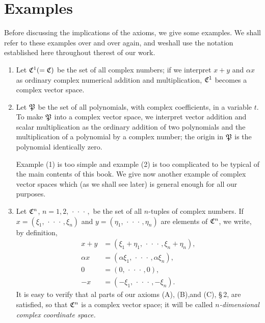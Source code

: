 \section{Examples}\label{sec-examples}

Before discussing the implications of the axioms, we give some examples. We
shall refer to these examples over and over again, and weshall use the notation
established here throughout therest of our work.

\begin{enumerate}[label=(\arabic*), wide, nosep]
    \item Let \(\mathfrak{C}^1 (= \mathfrak{C})\) be the set of all complex numbers; if we
    interpret \(x + y\) and \(\alpha x\) as ordinary complex numerical addition and
    multiplication, \(\mathfrak{C}^1\) becomes a complex vector space.
    
    \item Let \(\mathfrak{P}\) be the set of all polynomials, with complex
    coefficients, in a variable \(t\). To make \(\mathfrak{P}\) into a complex
    vector space, we interpret vector addition and scalar multiplication as the
    ordinary addition of two polynomials and the multiplication of a polynomial
    by a complex number; the origin in \(\mathfrak{P}\) is the polynomial
    identically zero.
    
    Example (1) is too simple and example (2) is too complicated to be typical
    of the main contents of this book. We give now another example of complex
    vector spaces which (as we shall see later) is general enough for all our
    purposes. 
    
    \item Let \(\mathfrak{C}^n\), \(n = 1, 2, \,\cdot\,\cdot\,\cdot\,,\) be the set
    of all \(n\)-tuples of complex numbers. If \(x =
    (\xi_1,\,\cdot\,\cdot\,\cdot\,, \xi_n)\) and \(y = (\eta_1,
    \,\cdot\,\cdot\,\cdot\,, \eta_n)\) are elements of \(\mathfrak{C}^n\), we write,
    by definition,
    \begin{align*}
        x + y &= (\xi_1 + \eta_1, \,\cdot\,\cdot\,\cdot\,, \xi_n + \eta_n),\\
        \alpha x &= (\alpha \xi_1, \,\cdot\,\cdot\,\cdot\,, \alpha \xi_n),\\
        0 &= (0, \,\cdot\,\cdot\,\cdot\,, 0),\\
        -x &= (-\xi_1, \,\cdot\,\cdot\,\cdot\,, -\xi_n).
    \end{align*}
    It is easy to verify that al parts of our axioms (A), (B),and (C), \S\,2,
    are satisfied, so that \(\mathfrak{C}^n\) is a complex vector space; it will be
    called \(n\)\emph{-dimensional complex coordinate space.}
    

\end{enumerate}

